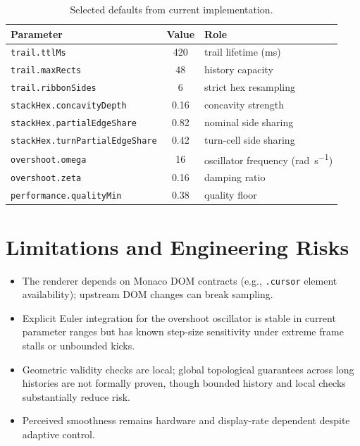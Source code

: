 \documentclass[journal]{IEEEtran}
\begin{document}
\begin{table}[!t]
\caption{Selected defaults from current implementation.}
\label{tab:defaults}
\centering
\scriptsize
\begin{tabular}{p{} c p{}}
\toprule
Parameter & Value & Role \\
\midrule
\texttt{trail.ttlMs} & 420 & trail lifetime (\si{\milli\second}) \\
\texttt{trail.maxRects} & 48 & history capacity \\
\texttt{trail.ribbonSides} & 6 & strict hex resampling \\
\texttt{stackHex.concavityDepth} & 0.16 & concavity strength \\
\texttt{stackHex.partialEdgeShare} & 0.82 & nominal side sharing \\
\texttt{stackHex.turnPartialEdgeShare} & 0.42 & turn-cell side sharing \\
\texttt{overshoot.omega} & 16 & oscillator frequency (\si{\radian\per\second}) \\
\texttt{overshoot.zeta} & 0.16 & damping ratio \\
\texttt{performance.qualityMin} & 0.38 & quality floor \\
\bottomrule
\end{tabular}
\end{table}

\section{Limitations and Engineering Risks}

\begin{itemize}
	\item The renderer depends on Monaco DOM contracts (e.g., \texttt{.cursor} element availability); upstream DOM changes can break sampling.
	\item Explicit Euler integration for the overshoot oscillator is stable in current parameter ranges but has known step-size sensitivity under extreme frame stalls or unbounded kicks.
	\item Geometric validity checks are local; global topological guarantees across long histories are not formally proven, though bounded history and local checks substantially reduce risk.
	\item Perceived smoothness remains hardware and display-rate dependent despite adaptive control.
\end{itemize}
\end{document}
